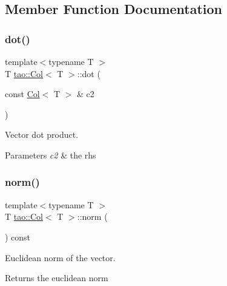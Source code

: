 \subsection{Member Function Documentation}
\mbox{\label{classtao_1_1_col_a605b320d536f27395162eff375af8514}} 
\subsubsection{\texorpdfstring{dot()}{dot()}}
{\footnotesize\ttfamily template$<$typename T $>$ \\
T \mbox{\hyperlink{classtao_1_1_col}{tao\+::\+Col}}$<$ T $>$\+::dot (\begin{DoxyParamCaption}\item[{const \mbox{\hyperlink{classtao_1_1_col}{Col}}$<$ T $>$ \&}]{c2 }\end{DoxyParamCaption})}



Vector dot product. 


\begin{DoxyParams}{Parameters}
{\em c2} & the rhs \\
\hline
\end{DoxyParams}
\mbox{\label{classtao_1_1_col_a229cd5a26d1fa4424150329127ca31d5}} 
\subsubsection{\texorpdfstring{norm()}{norm()}}
{\footnotesize\ttfamily template$<$typename T $>$ \\
T \mbox{\hyperlink{classtao_1_1_col}{tao\+::\+Col}}$<$ T $>$\+::norm (\begin{DoxyParamCaption}{ }\end{DoxyParamCaption}) const}



Euclidean norm of the vector. 

\begin{DoxyReturn}{Returns}
the euclidean norm 
\end{DoxyReturn}
\mbox{\label{classtao_1_1_col_a661dd9512fad58cfbedfdf52ca6806fb}} 

